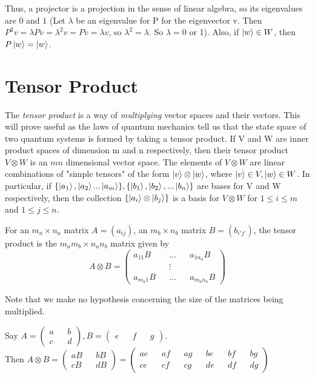 {Thus, a projector is a projection in the sense of linear algebra, so its eigenvalues are $0$ and $1$ (Let $\lambda$ be an eigenvalue for P for the eigenvector v. Then $P^2 v = \lambda Pv=\lambda^2 v = Pv =\lambda v$, so $\lambda^2=\lambda$. So $\lambda=0$ or 1).  Also, if $\ket{w} \in W$, then $P\ket{w}=\ket{w}$.


\pagebreak
\section{Tensor Product}

The \textit{tensor product} is a way of {\emph{multiplying}} vector spaces and their vectors. This will prove useful as the laws of quantum mechanics tell us that the state space of two quantum systems is formed by taking a tensor product. If V and W are inner product spaces of dimension m and n respectively, then their tensor product $V \otimes W$ is an $mn$ dimensional vector space. The elements of $V \otimes W$ are linear combinations of "simple tensors" of the form $\ket{v} \otimes \ket{w}$, where $\ket{v} \in V, \ket{w} \in W$. In particular, if $\{\ket{a_1}, \ket{a_2}...\ket{a_m}\}, \{\ket{b_1},\ket{b_2}, ...\ket{b_n}\}$ are bases for V and W respectively, then the collection $\{\ket{a_i}\otimes\ket{b_j}\}$ is a basis for $V \otimes W$ for $1\leq i \leq m$ and $1 \leq j \leq n$.


\begin{definition} 
For an $m_a \times n_a$ matrix $A=(a_{ij})$, an $m_b \times n_b$ matrix $B=(b_{i'j'})$, the tensor product is the $m_a m_b \times n_a n_b$ matrix given by
\begin{equation}
A \otimes B=\begin{pmatrix}
a_{11}B && \hdots && a_{1n_a}B\\
&& \vdots && \\ 
a_{m_a1}B && \hdots && a_{m_a n_a}B
\end{pmatrix}    
\end{equation}
\end{definition}
Note that we make no hypothesis concerning the size of the matrices being multiplied.

\begin{example}
Say $A=\begin{pmatrix}
a && b\\
c && d
\end{pmatrix},
B=\begin{pmatrix}
e && f && g
\end{pmatrix}$.\\
Then $A \otimes B
=\begin{pmatrix}
aB && bB\\
cB && dB
\end{pmatrix}
=\begin{pmatrix} 
ae && af && ag && be && bf && bg\\
ce && cf && cg && de && df && dg
\end{pmatrix}$
\end{example}

}
